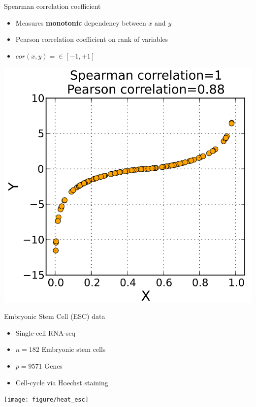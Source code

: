 \documentclass{beamer}\usepackage[]{graphicx}\usepackage[]{color}
\newenvironment{knitrout}{}{} %
\begin{document}
\begin{frame}{Spearman correlation coefficient}
  \begin{itemize}
    \item Measures \textbf{monotonic} dependency between $x$ and $y$
    \item Pearson correlation coefficient on rank of variables
    \item $cor(x,y) = \in \left[-1,+1\right]$
  \end{itemize}
  \begin{center}
    \includegraphics[width=0.4\linewidth]{spearman.png}
  \end{center}
\end{frame}



\begin{frame}[fragile]{Embryonic Stem Cell (ESC) data}
  \begin{itemize}
    \item Single-cell RNA-seq
    \item $n=182$ Embryonic stem cells
    \item $p=9571$ Genes
    \item Cell-cycle via Hoechst staining
  \end{itemize}
\begin{knitrout}\tiny
{}\color{fgcolor}

{\centering \texttt{[image: figure/heat\_esc]} 

}



\end{knitrout}
\end{frame}
\end{document}
